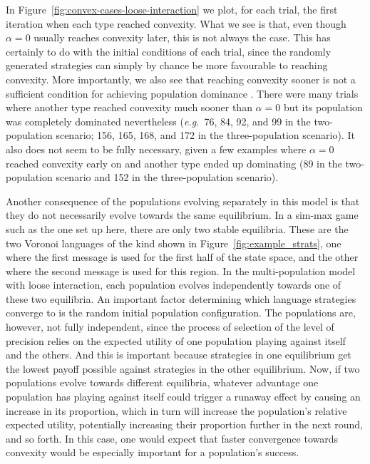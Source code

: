 \documentclass[a4paper]{article}
\begin{document}
In Figure~\ref{fig:convex-cases-loose-interaction} we plot, for each trial, the first iteration when each type reached convexity.
What we see is that, even though $\alpha = 0$ usually reaches convexity later, this is not always the case.
This has certainly to do with the initial conditions of each trial, since the randomly generated strategies can simply by chance be more favourable to reaching convexity.
More importantly, we also see that reaching convexity sooner is not a sufficient condition for achieving population dominance .
There were many trials where another type reached convexity much sooner than $\alpha = 0$ but its population was completely dominated nevertheless (\emph{e.g.}~76, 84, 92, and 99 in the two-population scenario; 156, 165, 168, and 172 in the three-population scenario).
It also does not seem to be fully necessary, given a few examples where $\alpha = 0$ reached convexity early on and another type ended up dominating (89 in the two-population scenario and 152 in the three-population scenario).

Another consequence of the populations evolving separately in this model is that they do not necessarily evolve towards the same equilibrium.
In a sim-max game such as the one set up here, there are only two stable equilibria.
These are the two Voronoi languages of the kind shown in Figure~\ref{fig:example_strats}, one where the first message is used for the first half of the state space, and the other where the second message is used for this region.
In the multi-population model with loose interaction, each population evolves independently towards one of these two equilibria.
An important factor determining which language strategies converge to is the random initial population configuration.
The populations are, however, not fully independent, since the process of selection of the level of precision relies on the expected utility of one population playing against itself and the others.
And this is important because strategies in one equilibrium get the lowest payoff possible against strategies in the other equilibrium.
Now, if two populations evolve towards different equilibria, whatever advantage one population has playing against itself could trigger a runaway effect by causing an increase in its proportion, which in turn will increase the population's relative expected utility, potentially increasing their proportion further in the next round, and so forth.
In this case, one would expect that faster convergence towards convexity would be especially important for a population's success.
\end{document}
